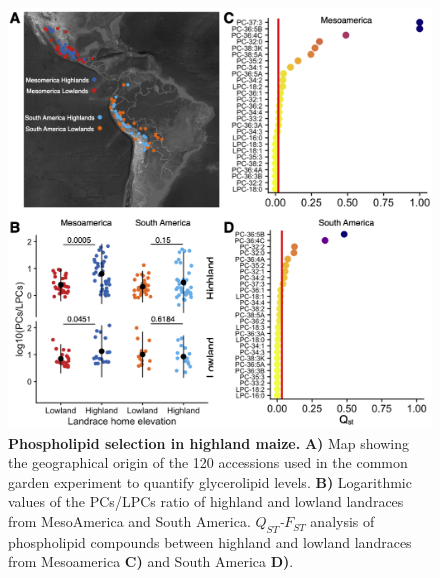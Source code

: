 \documentclass[9pt,twocolumn,twoside,lineno]{BioRxiv}
\begin{document}
\begin{figure}[!ht]
\begin{center}
\includegraphics[width=0.4\paperwidth]{Figures/Fig_1.png}
\caption{\textbf{Phospholipid selection in highland maize.} 
\textbf{A)} Map showing the geographical origin of the 120 accessions used in the common garden experiment to quantify glycerolipid levels.
\textbf{B)} Logarithmic values of the PCs/LPCs ratio of highland and lowland landraces from MesoAmerica and South America.
\textit{$Q_{ST}$-$F_{ST}$} analysis of phospholipid compounds between highland and lowland landraces from Mesoamerica \textbf{C)} and South America \textbf{D)}.
} 
\label{Fig1}
\end{center}
\end{figure}
\end{document}

